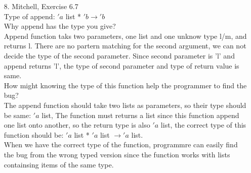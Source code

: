 \documentclass[12pt]{article}
\begin{document}
\begin{enumerate}
\item[8.] Mitchell, Exercise 6.7\\
Type of append: $'a$ list * $'b \to 'b$\\
Why append has the type you give?\\
Append function taks two parameters, one list and one unknow type l/m, and returns l. There are no partern matching for the second argument, we can not decide the type of the second parameter. Since second parameter is 'l' and append returns 'l', the type of second parameter and type of return value is same.\\
How might knowing the type of this function help the programmer to find the bug?\\
The append function should take two lists as parameters, so their type should be same: $'a$ list, The function must returns a list since this function append one list onto another, so the return type is also $'a$ list, the correct type of this function should be: $'a$ list * $'a$ list $\to 'a$ list.\\
When we have the correct type of the function, programmre can easily find the bug from the wrong typed version since the function works with lists containsing items of the same type.
\end{enumerate}
\end{document}
